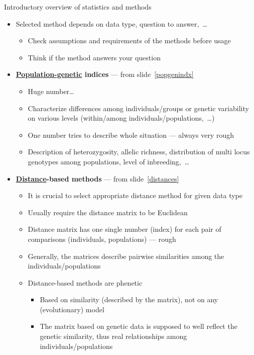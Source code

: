 \documentclass[compress, ucs, xelatex, 11pt, xcolor=svgnames,
	hyperref={
		bookmarks=true,
		unicode=true,
		colorlinks=true,
		pdftitle={Molecular data in R},
		plainpages=false,
		pdfauthor={Vojtech Zeisek},
		pdfsubject={Course about phylogeny and evolution in R},
		pdfcreator={XeLaTeX},
		pdfkeywords={R, evolution, phylogeny, molecular data},
		linkcolor=Tomato,
		anchorcolor=SaddleBrown,
		citecolor=Goldenrod,
		filecolor=DarkMagenta,
		menucolor=Sienna,
		urlcolor=DarkTurquoise,
		pdftex},
	url={hyphens, lowtilde} %
	]{beamer}
\begin{document}
\begin{frame}[allowframebreaks]{Introductory overview of statistics and methods}
	\begin{itemize}
		\item \alert{Selected method depends on data type, question to answer,~\ldots}
		\begin{itemize}
			\item Check assumptions and requirements of the methods before usage
			\item Think if the method answers your question
		\end{itemize}
		\item \textbf{\href{https://en.wikipedia.org/wiki/Population_genetics}{Population-genetic} indices} --- from slide~\ref{popgenindx}
		\begin{itemize}
			\item Huge number\ldots
			\item Characterize differences among individuals/groups or genetic variability on various levels (within/among individuals/populations,~\ldots)
			\item One number tries to describe whole situation --- always very rough
			\item Description of heterozygosity, allelic richness, distribution of multi locus genotypes among populations, level of inbreeding,~\ldots
		\end{itemize}
		\item \textbf{\href{https://en.wikipedia.org/wiki/Genetic_distance}{Distance}-based methods} --- from slide~\ref{distances}
		\begin{itemize}
			\item \alert{It is crucial to select appropriate distance method for given data type}
			\item Usually require the distance matrix to be Euclidean
			\item Distance matrix has one single number (index) for each pair of comparisons (individuals, populations) --- rough
			\item Generally, the matrices describe pairwise similarities among the individuals/populations
			\item Distance-based methods are phenetic
			\begin{itemize}
				\item Based on similarity (described by the matrix), not on any (evolutionary) model
				\item The matrix based on genetic data is supposed to well reflect the genetic similarity, thus real relationships among individuals/populations

\end{itemize}
\end{itemize}
\end{itemize}
\end{frame}
\end{document}

